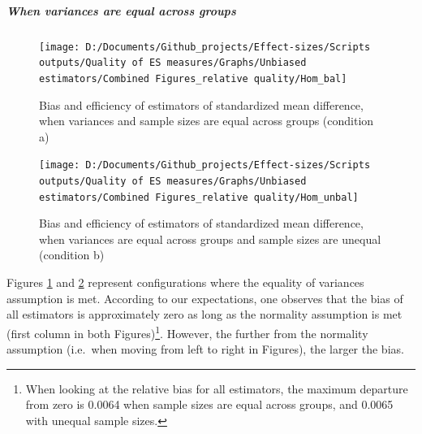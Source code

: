 \documentclass[
  man,floatsintext]{apa6}
\begin{document}
\hypertarget{when-variances-are-equal-across-groups}{%
\subparagraph{When variances are equal across groups}\label{when-variances-are-equal-across-groups}}

\begin{figure}

{\centering \texttt{[image: D:/Documents/Github\_projects/Effect-sizes/Scripts outputs/Quality of ES measures/Graphs/Unbiased estimators/Combined Figures\_relative quality/Hom\_bal]} 

}

\caption{Bias and efficiency of estimators of standardized mean difference, when variances and sample sizes are equal across groups (condition a)}\label{fig:idHombal}
\end{figure}

\begin{figure}

{\centering \texttt{[image: D:/Documents/Github\_projects/Effect-sizes/Scripts outputs/Quality of ES measures/Graphs/Unbiased estimators/Combined Figures\_relative quality/Hom\_unbal]} 

}

\caption{Bias and efficiency of estimators of standardized mean difference, when variances are equal across groups and sample sizes are unequal (condition b)}\label{fig:idHomunbal}
\end{figure}

Figures \ref{fig:idHombal} and \ref{fig:idHomunbal} represent configurations where the equality of variances assumption is met. According to our expectations, one observes that the bias of all estimators is approximately zero as long as the normality assumption is met (first column in both Figures)\footnote{When looking at the relative bias for all estimators, the maximum departure from zero is 0.0064 when sample sizes are equal across groups, and 0.0065 with unequal sample sizes.}. However, the further from the normality assumption (i.e.~when moving from left to right in Figures), the larger the bias.
\end{document}
